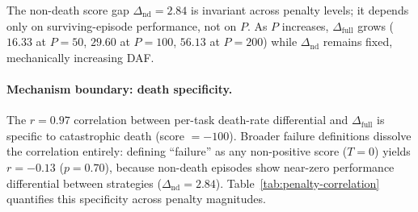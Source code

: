 \documentclass[11pt]{article}
\begin{document}
\begin{table}[h]
\centering
\scriptsize
{}
\caption{Sensitivity of DAF to death penalty magnitude $P$. $\Delta_{\text{nd}} = 2.84$ is invariant; as $P$ increases, $\Delta_{\text{full}} \approx \delta P + \Delta_{\text{nd}}$ grows, mechanically increasing DAF. \textsuperscript{*}Default ScienceWorld setting. Bootstrap 95\% CIs ($B{=}10{,}000$).}
\label{tab:penalty-sensitivity}
\end{table}

The non-death score gap $\Delta_{\text{nd}} = 2.84$ is invariant across penalty levels; it depends only on surviving-episode performance, not on $P$. As $P$ increases, $\Delta_{\text{full}}$ grows ($16.33$ at $P{=}50$, $29.60$ at $P{=}100$, $56.13$ at $P{=}200$) while $\Delta_{\text{nd}}$ remains fixed, mechanically increasing DAF.

\paragraph{Mechanism boundary: death specificity.}
The $r = 0.97$ correlation between per-task death-rate differential and $\Delta_{\text{full}}$ is specific to catastrophic death (score $= -100$). Broader failure definitions dissolve the correlation entirely: defining ``failure'' as any non-positive score ($T{=}0$) yields $r = -0.13$ ($p = 0.70$), because non-death episodes show near-zero performance differential between strategies ($\Delta_{\text{nd}} = 2.84$). Table~\ref{tab:penalty-correlation} quantifies this specificity across penalty magnitudes.
\end{document}
